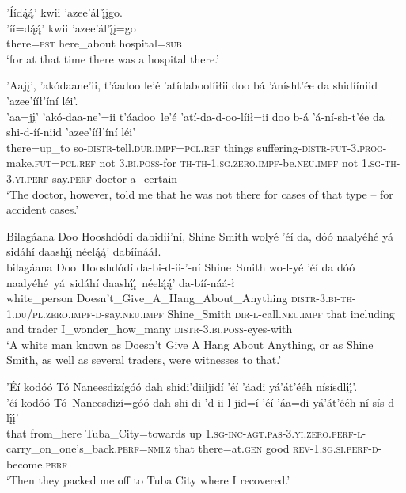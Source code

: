 \newpage
\ea\label{ex:text7-8-2}
’Íídą́ą́’ kwii ’azee’ál’į́įgo.\\
\gll ’íí=dą́ą́’	kwii	’azee’ál’į́į=go\\
     there=\textsc{pst}	here\_about	hospital=\textsc{sub}\\
\glt `for at that time there was a hospital there.'
\z

\ea\label{ex:text7-8-3}
’Aajį’, ’akódaane’ii, t’áadoo le’é ’atídaboolíiłii doo bá ’ánísht’ée da shidííniid ’azee’ííł’íní léi’.\\
\gll ’aa=jį’	’akó-daa-ne’=ii	t’áadoo~{le’é}	’atí-da-d-oo-líił=ii	doo	b-á	’á-ní-sh-t’ée	da	shi-d-íí-niid	’azee’ííł’íní	léi’\\
     there=up\_to	so-\textsc{distr}-tell.\textsc{dur}.\textsc{impf}=\textsc{pcl}.\textsc{ref}	things	suffering-\textsc{distr}-\textsc{fut}-3.\textsc{prog}-make.\textsc{fut}=\textsc{pcl}.\textsc{ref}	not	3.\textsc{bi}.\textsc{poss}-for	\textsc{th}-\textsc{th}-1.\textsc{sg}.\textsc{zero}.\textsc{impf}-be.\textsc{neu}.\textsc{impf}	not	1.\textsc{sg}-\textsc{th}-3.\textsc{yi}.\textsc{perf}-say.\textsc{perf}	doctor	a\_certain\\
\glt `The doctor, however, told me that he was not there for cases of that type -- for accident cases.'
\z

\ea\label{ex:text7-8-4}
Bilagáana Doo Hooshdódí dabidii’ní, Shine Smith wolyé ’éí da, dóó naalyéhé yá sidáhí daashį́į́ néelą́ą́’ dabíínááł.\\
\gll bilagáana	Doo~{Hooshdódí}	da-bi-d-ii-’-ní	Shine~{Smith}	wo-l-yé	’éí	da	dóó	naalyéhé~yá~{sidáhí}	daashį́į́~{néelą́ą́’}	da-bíí-náá-ł\\
     white\_person	Doesn’t\_Give\_A\_Hang\_About\_Anything	\textsc{distr}-3.\textsc{bi}-\textsc{th}-1.\textsc{du}/\textsc{pl}.\textsc{zero}.\textsc{impf}-\textsc{d}-say.\textsc{neu}.\textsc{impf}	Shine\_Smith	\textsc{dir}-\textsc{l}-call.\textsc{neu}.\textsc{impf}	that	including	and	trader	I\_wonder\_how\_many	\textsc{distr}-3.\textsc{bi}.\textsc{poss}-eyes-with\\
\glt `A white man known as Doesn't Give A Hang About Anything, or as Shine Smith, as well as several traders, were witnesses to that.'
\z

\ea\label{ex:text7-8-5}
’Éí kodóó Tó Naneesdizígóó dah shidi’diiljidí ’éí ’áadi yá’át’ééh nísísdlį́į́’.\\
\gll ’éí	kodóó	Tó~{Naneesdizí=góó}	dah	shi-di-’d-ii-l-jid=í	’éí	’áa=di	yá’át’ééh	ní-sís-d-lį́į́’\\
     that	from\_here	Tuba\_City=towards	up	1.\textsc{sg}-\textsc{inc}-\textsc{agt}.\textsc{pas}-3.\textsc{yi}.\textsc{zero}.\textsc{perf}-\textsc{l}-carry\_on\_one's\_back.\textsc{perf}=\textsc{nmlz}	that	there=at.\textsc{gen}	good	\textsc{rev}-1.\textsc{sg}.\textsc{si}.\textsc{perf}-\textsc{d}-become.\textsc{perf}\\
\glt `Then they packed me off to Tuba City where I recovered.'
\z

